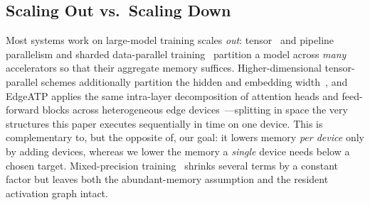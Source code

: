 \documentclass[journal]{IEEEtran}
\begin{document}
\subsection{Scaling Out vs.\ Scaling Down}
Most systems work on large-model training scales \emph{out}:
tensor~\cite{shoeybi2019megatron,narayanan2021megatron} and
pipeline~\cite{huang2019gpipe} parallelism and sharded data-parallel
training~\cite{rajbhandari2020zero,zhao2023fsdp} partition a model across
\emph{many} accelerators so that their aggregate memory suffices. Higher-dimensional
tensor-parallel schemes additionally partition the hidden and embedding
width~\cite{wang2022tesseract}, and EdgeATP applies the same intra-layer
decomposition of attention heads and feed-forward blocks across
heterogeneous edge devices~\cite{wang2026edgeatp}---splitting in space
the very structures this paper executes sequentially in time on one
device. This is complementary to, but the opposite
of, our goal: it lowers memory \emph{per device} only by adding devices,
whereas we lower the memory a \emph{single} device needs below a chosen
target. Mixed-precision training~\cite{micikevicius2018mixed} shrinks several
terms by a constant factor but leaves both the abundant-memory assumption and
the resident activation graph intact.
\end{document}
